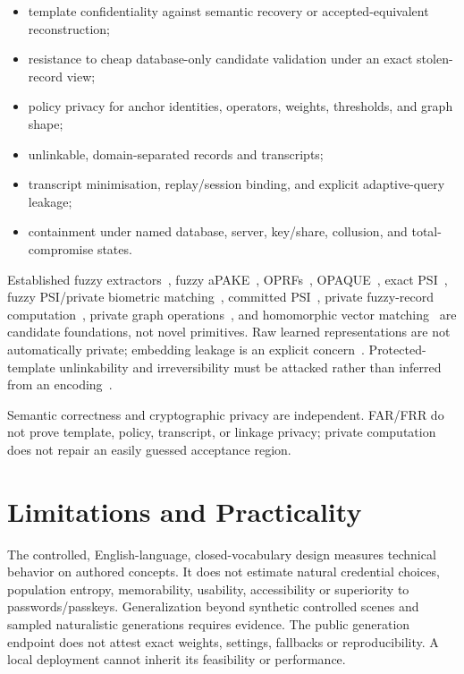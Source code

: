 \documentclass[compsoc,conference,a4paper,10pt,times]{IEEEtran}
\begin{document}
\begin{itemize}[leftmargin=*]
  \item template confidentiality against semantic recovery or accepted-equivalent reconstruction;
  \item resistance to cheap database-only candidate validation under an exact stolen-record view;
  \item policy privacy for anchor identities, operators, weights, thresholds, and graph shape;
  \item unlinkable, domain-separated records and transcripts;
  \item transcript minimisation, replay/session binding, and explicit adaptive-query leakage;
  \item containment under named database, server, key/share, collusion, and total-compromise states.
\end{itemize}

Established fuzzy extractors~\cite{Dodis2008FuzzyExtractors}, fuzzy aPAKE~\cite{Erwig2020FuzzyAPAKE}, OPRFs~\cite{Davidson2023OPRF}, OPAQUE~\cite{Bourdrez2025OPAQUE}, exact PSI~\cite{Freedman2004PrivateMatching,Pinkas2015Phasing}, fuzzy PSI/private biometric matching~\cite{Uzun2021FLPSI,Blass2026FuzzyPSI}, committed PSI~\cite{Goel2026PICS}, private fuzzy-record computation~\cite{Han2025FuzzyRecords}, private graph operations~\cite{Li2020PrivateGraph}, and homomorphic vector matching~\cite{Martin2025HyDia} are candidate foundations, not novel primitives. Raw learned representations are not automatically private; embedding leakage is an explicit concern~\cite{Song2020EmbeddingLeakage}. Protected-template unlinkability and irreversibility must be attacked rather than inferred from an encoding~\cite{GomezBarrero2016Unlinkable}.

Semantic correctness and cryptographic privacy are independent. FAR/FRR do not prove template, policy, transcript, or linkage privacy; private computation does not repair an easily guessed acceptance region.

\section{Limitations and Practicality}
\label{sec:limitations}
The controlled, English-language, closed-vocabulary design measures technical behavior on authored concepts. It does not estimate natural credential choices, population entropy, memorability, usability, accessibility or superiority to passwords/passkeys. Generalization beyond synthetic controlled scenes and sampled naturalistic generations requires evidence. The public generation endpoint does not attest exact weights, settings, fallbacks or reproducibility. A local deployment cannot inherit its feasibility or performance.
\end{document}
